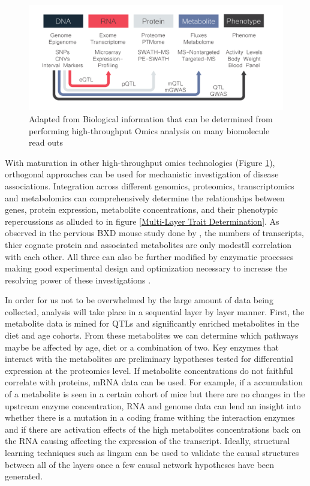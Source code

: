\documentclass[a4paper,11pt,twoside]{book}
\begin{document}
	\begin{figure}
		\includegraphics[width=1.2\textwidth]{1.Introduction_Figures/Multiomics.pdf}
		\caption{Adapted from \citep{Dumas2012} Biological information that can be determined from performing high-throughput Omics analysis on many biomolecule read outs}
		\label{fig:Multi_Omics Methods}
	\end{figure}
	
	With maturation in other high-throughput omics technologies (Figure \ref{fig:Multi_Omics Methods}), orthogonal approaches can be used for mechanistic investigation of disease associations. Integration across different genomics, proteomics, transcriptomics and metabolomics can comprehensively determine the relationships between genes, protein expression, metabolite concentrations, and their phenotypic repercussions as alluded to in figure \ref{Multi-Layer Trait Determination}. As observed in the pervious BXD mouse study done by \citet{Williams2016SystemsFunction}, the numbers of transcripts, thier cognate protein and associated metabolites are only modestll correlation with each other. All three can also be further modified by enzymatic processes making good experimental design and optimization necessary to increase the resolving power of these investigations \citep{Johnson2016Metabolomics:Mechanisms}. 
	
	In order for us not to be overwhelmed by the large amount of data being collected, analysis will take place in a sequential layer by layer manner. First, the metabolite data is mined for QTLs and significantly enriched metabolites in the diet and age cohorts. From these metabolites we can determine which pathways maybe be affected by age, diet or a combination of two. Key enzymes that interact with the metabolites are preliminary hypotheses tested for differential expression at the proteomics level. If metabolite concentrations do not faithful correlate with proteins, mRNA data can be used. For example, if a accumulation of a metabolite is seen in a certain cohort of mice but there are no changes in the upstream enzyme concentration, RNA and genome data can lend an insight into whether there is a mutation in a coding frame withing the interaction enzymes and if there are activation effects of the high metabolites concentrations back on the RNA causing affecting the expression of the transcript. Ideally, structural learning techniques such as lingam\citep{ShimizuLiNGAM:Structures} can be used to validate the causal structures between all of the layers once a few causal network hypotheses have been generated.
	
\end{document}
